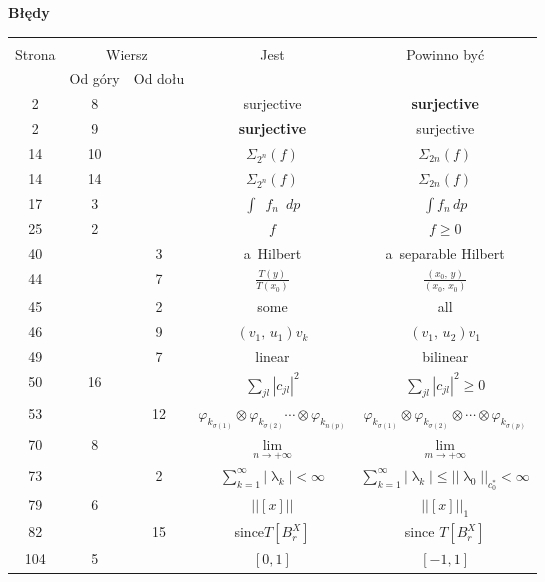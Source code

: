 \documentclass[a4paper,11pt]{article}
\newcommand{\tb}{\textbf}
\newcommand{\tb}{\textbf}
\newcommand{\Center}[1]{\begin{center} #1 \end{center}}
\newcommand{\CenterTB}[1]{\Center{\tb{#1}}}
\newcommand{\fr}{\frac}
\newcommand{\ra}{\rightarrow}
\providecommand{\absj}[1]{\lvert #1 \rvert}
\providecommand{\absd}[1]{\left| #1 \right|}
\providecommand{\absd}[1]{\left| \, #1 \, \right|}
\newcommand{\norm}[1]{\left|\left| #1 \right|\right|}
\newcommand{\la}{\uplambda}
\newcommand{\vp}{\varphi}
\newcommand{\si}{\sigma}
\newcommand{\Si}{\Sigma}
\newcommand{\ot}{\otimes}
\newcommand{\Lim}{\lim\limits}
\newcommand{\Sum}{\sum\limits}
\newcommand{\Int}{\int\limits}
\newcommand{\Int}{\int\limits}
\newcommand{\IntCaD}[2] { \Int #1 \, d#2 } %
\newcommand{\SP}[2]{( #1, \, #2 )}  %
\begin{document}
\newpage
\CenterTB{Błędy}
\begin{center}
  \begin{tabular}{|c|c|c|c|c|}
    \hline
    & \multicolumn{2}{c|}{} & & \\
    Strona & \multicolumn{2}{c|}{Wiersz}& Jest & Powinno być \\ \cline{2-3}
    & Od góry & Od dołu &  &  \\ \hline
    2   &  8 & & surjective & \tb{surjective} \\
    2   &  9 & & \tb{surjective} & surjective \\
    14  & 10 & & $\Si_{ 2^{ n } }( f )$ & $\Si_{ 2 n }( f )$ \\
    14  & 14 & & $\Si_{ 2^{ n } }( f )$ & $\Si_{ 2 n }( f )$ \\
    17  &  3 & & $\int \;\: f_{ n } \;\: dp$ & $\IntCaD{ f_{ n } }{ p }$ \\
    25  &  2 & & $f$ & $f \geq 0$ \\
    40  & & 3 & a~Hilbert & a~separable Hilbert \\
    44  & & 7 & $\fr{ T( y ) }{ T( x_{ 0 } ) }$
           & $\fr{ \SP{ x_{ 0 } }{ y } }{ \SP{ x_{ 0 } }{ x_{ 0 } } }$ \\
    45  & & 2 & some & all \\
    46  & & 9 & $\SP{ v_{ 1 } }{ u_{ 1 } } v_{ k }$
           & $\SP{ v_{ 1 } }{ u_{ 2 } } v_{ 1 }$ \\
    49  & & 7 & linear & bilinear \\
    50  & 16 & & $\Sum_{ j l } \absd{ c_{ j l } }^{ 2 }$
           & $\Sum_{ j l } \absd{ c_{ j l } }^{ 2 } \geq 0$ \\
    53  & & 12 & $\vp_{ k_{ \si( 1 ) } } \ot \vp_{ k_{ \si( 2 ) } } \cdots
                 \ot \vp_{ k_{ n( p ) } }$
           & $\vp_{ k_{ \si( 1 ) } } \ot \vp_{ k_{ \si( 2 ) } } \ot \cdots
             \ot \vp_{ k_{ \si( p ) } }$ \\
    70  & 8 & & $\Lim_{ n \ra +\infty }$ & $\Lim_{ m \ra +\infty }$ \\ %
    73  & & 2 & $\Sum_{ k = 1 }^{ \infty } \absd{ \la_{ k } } < \infty$
           & $\Sum_{ k = 1 }^{ \infty } \absj{ \la_{ k } } \leq
             \norm{ \la_{ 0 } }_{ c_{ 0 }^{ * } } < \infty$ \\
    79  & 6 & & $\norm{ [x] }$ & $\norm{ [x] }_{ 1 }$ \\
    82  & & 15 & since$T[ B_{ r }^{ X } ]$ & since $T[ B_{ r }^{ X } ]$ \\
    104 &  5 & & $[ 0, 1 ]$ & $[ -1, 1 ]$ \\

\end{tabular}
\end{center}
\end{document}
